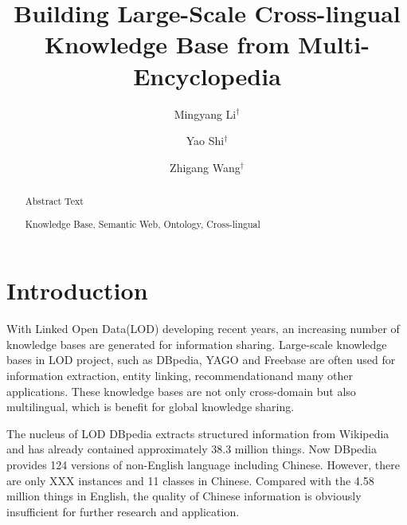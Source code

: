 \documentclass[runningheads,a4paper]{llncs}
\newcommand{\keywords}[1]{\par\addvspace\baselineskip\noindent\keywordname\enspace\ignorespaces#1}
\begin{document}
\mainmatter

\title{Building Large-Scale Cross-lingual Knowledge Base from Multi-Encyclopedia}
\author{Mingyang Li$^\dag$ \and Yao Shi$^\dag$ \and Zhigang Wang$^\dag$}


\maketitle

\begin{abstract}
    Abstract Text

\keywords{Knowledge Base, Semantic Web, Ontology, Cross-lingual}
\end{abstract}

\section{Introduction}
With Linked Open Data(LOD) developing recent years, an increasing number of knowledge bases are generated for information sharing. Large-scale knowledge bases in LOD project, such as DBpedia\cite{mendes2012dbpedia}, YAGO\cite{mahdisoltani2014yago3} and Freebase\cite{bollacker2008freebase} are often used for information extraction\cite{dutta2013integrating}, entity linking\cite{shen2012linden}, recommendation\cite{passant2010dbrec,fernandez2011generic,kaminskas2012knowledge}and many other applications. These knowledge bases are not only cross-domain but also multilingual, which is benefit for global knowledge sharing.  

 The nucleus of LOD DBpedia extracts structured information from Wikipedia and has already contained approximately 38.3 million things. Now DBpedia provides 124 versions of non-English language including Chinese. However, there are only XXX instances and 11 classes in Chinese. Compared with the 4.58 million things in English, the quality of Chinese information is obviously insufficient for further research and application.
\end{document}
